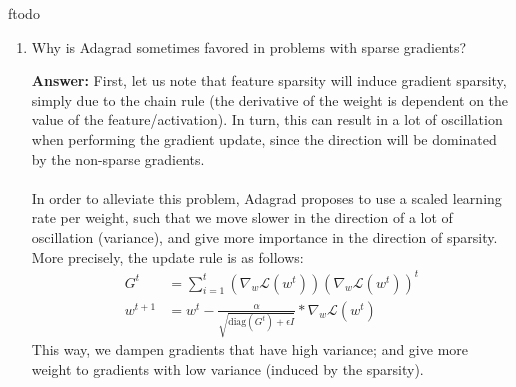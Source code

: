 ƒtodo\documentclass{article}
\newenvironment{QandA}{\begin{enumerate}[label=\arabic*.]}{\end{enumerate}}
\newenvironment{InnerQandA}{\begin{enumerate}[label=\roman*.]}{\end{enumerate}}
\newenvironment{answer}{\par\normalfont \textbf{Answer:}}{}
\begin{document}
\begin{QandA}
\begin{InnerQandA}
        \item What happens when you use the entire training data in a batch?
        \begin{answer}
            After performing a forward pass and a backward pass for each sample in the dataset, we take a step in the direction of the cumulative gradient. This is extremely slow to converge, as today's datasets are extremely large in size, which implies that we perform gradient updates too rarely. 
        \end{answer}

        \item How should we adjust the learning rate as we increase or decrease the batch size?
        \begin{answer}
            When utilizing larger batches, we can afford to have large learning rates, as the approximated gradient of the batch is closer to the true gradient. On the other hand, using very small batches yields noisy estimates of the gradient, and is therefore advisable to also use small learning rates so that we don't diverge in our optimization procedure. 
        \end{answer}
    \end{InnerQandA}

    \item Why is Adagrad sometimes favored in problems with sparse gradients?
    \begin{answer}
        First, let us note that feature sparsity will induce gradient sparsity, simply due to the chain rule (the derivative of the weight is dependent on the value of the feature/activation). In turn, this can result in a lot of oscillation when performing the gradient update, since the direction will be dominated by the non-sparse gradients. \\\\
        In order to alleviate this problem, Adagrad proposes to use a scaled learning rate per weight, such that we move slower in the direction of a lot of oscillation (variance), and give more importance in the direction of sparsity. More precisely, the update rule is as follows:
        \begin{align*}
            G^t &= \sum_{i=1}^t \left(\nabla_w{\mathcal{L}(w^t)}\right) \left(\nabla_w{\mathcal{L}}(w^t)\right)^t \\
            w^{t+1} &= w^t - \frac{\alpha}{\sqrt{\text{diag}(G^t) + \epsilon I}} * \nabla_w \mathcal{L}(w^t)
        \end{align*}
        This way, we dampen gradients that have high variance; and give more weight to gradients with low variance (induced by the sparsity).


\end{answer}
\end{QandA}
\end{document}
